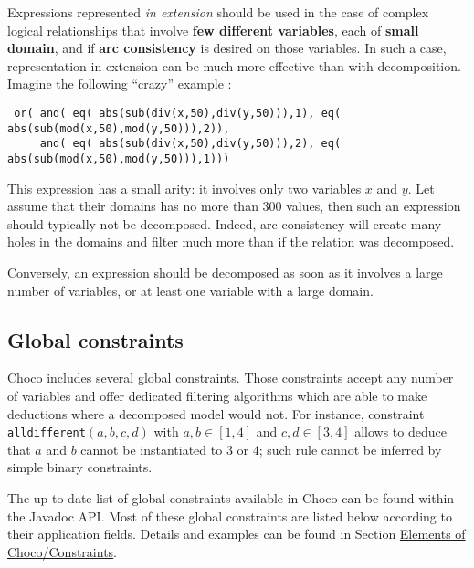 Expressions represented \emph{in extension} should be used in the case of complex logical relationships that involve \textbf{few different variables}, each of \textbf{small domain}, and if \textbf{arc consistency} is desired on those variables.
In such a case, representation in extension can be much more effective than with decomposition. Imagine the following ``crazy'' example :
\begin{lstlisting}
 or( and( eq( abs(sub(div(x,50),div(y,50))),1), eq( abs(sub(mod(x,50),mod(y,50))),2)),
     and( eq( abs(sub(div(x,50),div(y,50))),2), eq( abs(sub(mod(x,50),mod(y,50))),1)))
\end{lstlisting}
This expression has a small arity: it involves only two variables $x$ and $y$.
Let assume that their domains has no more than 300 values, then such an expression should typically not be decomposed. Indeed, arc consistency will create many holes in the domains and filter much more than if the relation was decomposed.

Conversely, an expression should be decomposed as soon as it involves a large number of variables, or at least one variable with a large domain.


\subsection{Global constraints}\label{model:advancedconstraints}\hypertarget{model:advancedconstraints}{}
Choco includes several \href{http://www.emn.fr/x-info/sdemasse/gccat/}{global constraints}. Those constraints accept any number of variables and offer dedicated filtering algorithms which are able to make deductions where a decomposed model would not.
For instance, constraint \texttt{alldifferent}$(a,b,c,d)$ with $a,b\in[1,4]$ and $c,d\in[3,4]$ allows to deduce that $a$ and $b$ cannot be instantiated to $3$ or $4$; such rule cannot be inferred by simple binary constraints. 

The up-to-date list of global constraints available in Choco can be found within the Javadoc API.
Most of these global constraints are listed below according to their application fields.
Details and examples can be found in Section \hyperlink{ch:constraints}{Elements of Choco/Constraints}.
